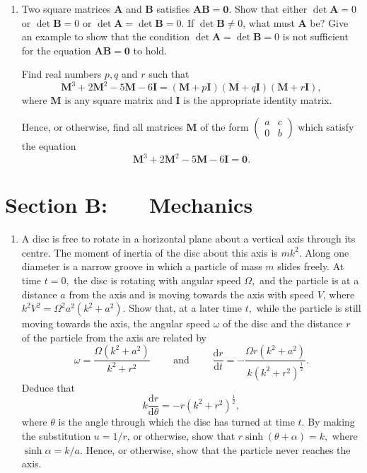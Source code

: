 \documentclass[a4, 11pt]{report}
\newlength{\qspace}
\newcounter{qnumber}
\newenvironment{question}%
 {\vspace{\qspace}
  \begin{enumerate}[\bfseries 1\quad][10]%
    \setcounter{enumi}{\value{qnumber}}%
    \item%
 }
{
  \end{enumerate}
  \filbreak
  \stepcounter{qnumber}
 }
\begin{document}
	
\begin{question}
Two square matrices $\mathbf{A}$ and $\mathbf{B}$ satisfies $\mathbf{AB=0}.$
Show that either $\det\mathbf{A}=0$ or $\det\mathbf{B}=0$ or $\det\mathbf{A}=\det\mathbf{B}=0$.
If $\det\mathbf{B}\neq0$, what must $\mathbf{A}$ be? Give an example
to show that the condition $\det\mathbf{A}=\det\mathbf{B}=0$ is not
sufficient for the equation $\mathbf{AB=0}$ to hold. 


Find real numbers $p,q$ and $r$ such that 
\[
\mathbf{M}^{3}+2\mathbf{M}^{2}-5\mathbf{M}-6\mathbf{I}=(\mathbf{M}+p\mathbf{I})(\mathbf{M}+q\mathbf{I})(\mathbf{M}+r\mathbf{I}),
\]
where $\mathbf{M}$ is any square matrix and $\mathbf{I}$ is the
appropriate identity matrix. 


Hence, or otherwise, find all matrices $\mathbf{M}$ of the form $\begin{pmatrix}a & c\\
0 & b
\end{pmatrix}$ which satisfy the equation 
\[
\mathbf{M}^{3}+2\mathbf{M}^{2}-5\mathbf{M}-6\mathbf{I}=\mathbf{0}.
\]
			\end{question}
			
		
		
		
	
\newpage
\section*{Section B: \ \ \ Mechanics}


	
\begin{question}
A disc is free to rotate in a horizontal plane about a vertical axis
through its centre. The moment of inertia of the disc about this axis
is $mk^{2}.$ Along one diameter is a narrow groove in which a particle
of mass $m$ slides freely. At time $t=0,$ the disc is rotating with
angular speed $\Omega,$ and the particle is at a distance $a$ from
the axis and is moving towards the axis with speed $V$, where $k^{2}V^{2}=\Omega^{2}a^{2}(k^{2}+a^{2}).$
Show that, at a later time $t,$ while the particle is still moving
towards the axis, the angular speed $\omega$ of the disc and the
distance $r$ of the particle from the axis are related by 
\[
\omega=\frac{\Omega(k^{2}+a^{2})}{k^{2}+r^{2}}\qquad\mbox{ and }\qquad\frac{\mathrm{d}r}{\mathrm{d}t}=-\frac{\Omega r(k^{2}+a^{2})}{k(k^{2}+r^{2})^{\frac{1}{2}}}.
\]
Deduce that 
\[
k\frac{\mathrm{d}r}{\mathrm{d}\theta}=-r(k^{2}+r^{2})^{\frac{1}{2}},
\]
where $\theta$ is the angle through which the disc has turned at
time $t$. By making the substitution $u=1/r$, or otherwise, show
that $r\sinh(\theta+\alpha)=k,$ where $\sinh\alpha=k/a.$ Hence,
or otherwise, show that the particle never reaches the axis. 
	\end{question}
	
\end{document}
